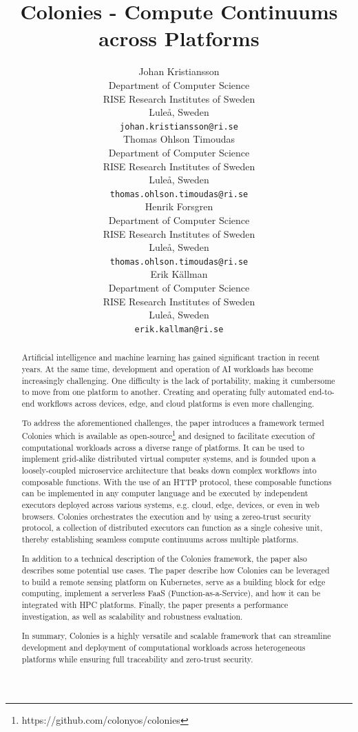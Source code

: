 \documentclass{article}
\title{Colonies - Compute Continuums across Platforms}
\author{{\hspace{1mm}Johan Kristiansson} \\
	Department of Computer Science \\
	RISE Research Institutes of Sweden \\
	Luleå, Sweden \\
	\texttt{johan.kristiansson@ri.se} \\
	\And
	{\hspace{1mm}Thomas Ohlson Timoudas} \\
	Department of Computer Science \\
	RISE Research Institutes of Sweden \\
	Luleå, Sweden \\
	\texttt{thomas.ohlson.timoudas@ri.se} \\
	\And
	{\hspace{1mm}Henrik Forsgren} \\
	Department of Computer Science \\
	RISE Research Institutes of Sweden \\
	Luleå, Sweden \\
	\texttt{thomas.ohlson.timoudas@ri.se} \\
	\And
	{\hspace{1mm}Erik Källman} \\
	Department of Computer Science \\
	RISE Research Institutes of Sweden \\
	Luleå, Sweden \\
	\texttt{erik.kallman@ri.se} \\
}
\begin{document}
\maketitle

\begin{abstract}
Artificial intelligence and machine learning has gained significant traction in recent years. At the same time, development and operation of AI workloads has become increasingly challenging. One difficulty is the lack of portability, making it cumbersome to move from one platform to another. Creating and operating fully automated end-to-end workflows across devices, edge, and cloud platforms is even more challenging.

To address the aforementioned challenges, the paper introduces a framework termed Colonies which is available as open-source\footnote{https://github.com/colonyos/colonies} and designed to facilitate execution of computational workloads across a diverse range of platforms. It can be used to implement grid-alike distributed virtual computer systems, and is founded upon a loosely-coupled microservice architecture that beaks down complex workflows into composable functions. With the use of an HTTP protocol, these composable functions can be implemented in any computer language and be executed by independent executors deployed across various systems, e.g. cloud, edge, devices, or even in web browsers. Colonies orchestrates the execution and by using a zereo-trust security protocol, a collection of distributed executors can function as a single cohesive unit, thereby establishing seamless compute continuums across multiple platforms.

In addition to a technical description of the Colonies framework, the paper also describes some potential use cases. The paper describe how Colonies can be leveraged to build a remote sensing platform on Kubernetes, serve as a building block for edge computing, implement a serverless FaaS (Function-as-a-Service), and how it can be integrated with HPC platforms. Finally, the paper presents a performance investigation, as well as scalability and robustness evaluation. 

In summary, Colonies is a highly versatile and scalable framework that can streamline development and deployment of computational workloads across heterogeneous platforms while ensuring full traceability and zero-trust security.
\end{abstract}

\end{document}
